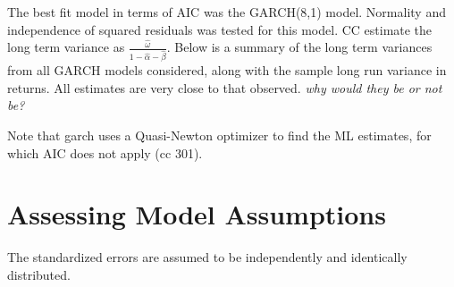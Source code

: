 \documentclass[11pt]{article}\usepackage[]{graphicx}\usepackage[]{color}
\makeatletter
\newenvironment{kframe}{%
 \def\at@end@of@kframe{}%
 \ifinner\ifhmode%
  \def\at@end@of@kframe{\end{minipage}}%
  \begin{minipage}{\columnwidth}%
 \fi\fi%
 \def\FrameCommand##1{\hskip\@totalleftmargin \hskip-\fboxsep
 \colorbox{shadecolor}{##1}\hskip-\fboxsep
     \hskip-\linewidth \hskip-\@totalleftmargin \hskip\columnwidth}%
 \MakeFramed {\advance\hsize-\width
   \@totalleftmargin\z@ \linewidth\hsize
   \@setminipage}}%
 {\par\unskip\endMakeFramed%
 \at@end@of@kframe}
\newenvironment{knitrout}{}{} %
\makeatother
\begin{document}
The best fit model in terms of AIC was the GARCH(8,1) model. Normality and independence of squared residuals was tested for this model. CC estimate the long term variance as $\frac{\hat{\omega}}{1-\hat{\alpha} - \hat{\beta}}$. Below is a summary of the long term variances from all GARCH models considered, along with the sample long run variance in returns. All estimates are very close to that observed. {\it why would they be or not be?}

Note that garch uses a Quasi-Newton optimizer to find the ML estimates, for which AIC does not apply (cc 301).

\begin{knitrout}\footnotesize
{}\color{fgcolor}\begin{kframe}


{\ttfamily\noindent\bfseries\color{errorcolor}{Error in coef(g121): object 'g121' not found}}

{\ttfamily\noindent\bfseries\color{errorcolor}{Error in coef(g121): object 'g121' not found}}

{\ttfamily\noindent\bfseries\color{errorcolor}{Error in data.frame(c(g8\_var, g121\_var, g11\_var, r.obs\_var)): object 'g121\_var' not found}}

{\ttfamily\noindent\bfseries{}}

{\ttfamily\noindent\bfseries{}}

{\ttfamily\noindent\bfseries\color{errorcolor}{Error in xtable(var\_all): object 'var\_all' not found}}\end{kframe}
\end{knitrout}


\section*{Assessing Model Assumptions}

The standardized errors are assumed to be independently and identically distributed.
\end{document}
